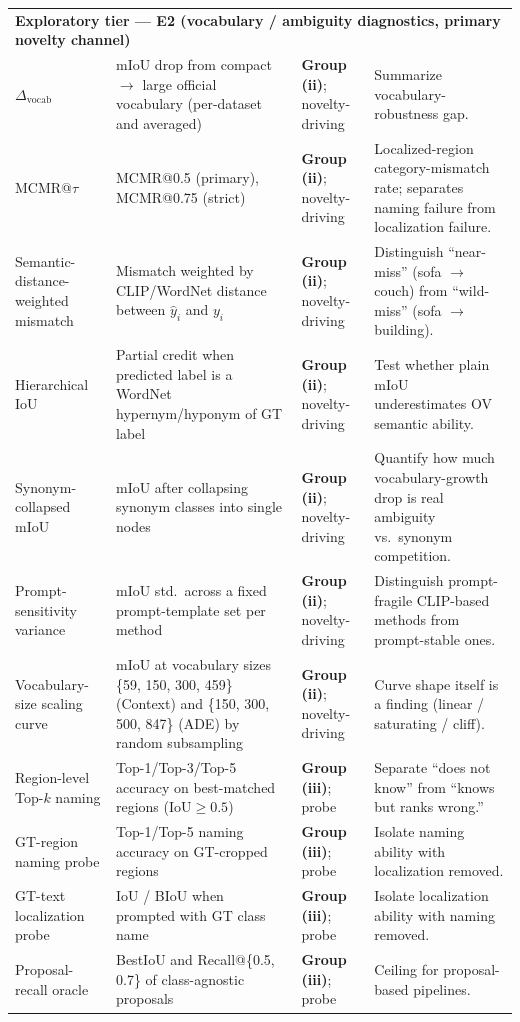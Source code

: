 \documentclass[11pt,a4paper]{article}
\begin{document}
{\begin{longtable}{p{} p{} p{} p{}}
\midrule
\multicolumn{4}{l}{\textbf{Exploratory tier --- E2 (vocabulary / ambiguity diagnostics, primary novelty channel)}} \\
$\Delta_{\mathrm{vocab}}$ & mIoU drop from compact $\to$ large official vocabulary (per-dataset and averaged) & \textbf{Group (ii)}; novelty-driving & Summarize vocabulary-robustness gap. \\
MCMR@$\tau$ & MCMR@0.5 (primary), MCMR@0.75 (strict) & \textbf{Group (ii)}; novelty-driving & Localized-region category-mismatch rate; separates naming failure from localization failure. \\
Semantic-distance-weighted mismatch & Mismatch weighted by CLIP/WordNet distance between $\hat{y}_i$ and $y_i$ & \textbf{Group (ii)}; novelty-driving & Distinguish ``near-miss'' (sofa $\to$ couch) from ``wild-miss'' (sofa $\to$ building). \\
Hierarchical IoU & Partial credit when predicted label is a WordNet hypernym/hyponym of GT label & \textbf{Group (ii)}; novelty-driving & Test whether plain mIoU underestimates OV semantic ability. \\
Synonym-collapsed mIoU & mIoU after collapsing synonym classes into single nodes & \textbf{Group (ii)}; novelty-driving & Quantify how much vocabulary-growth drop is real ambiguity vs.\ synonym competition. \\
Prompt-sensitivity variance & mIoU std.\ across a fixed prompt-template set per method & \textbf{Group (ii)}; novelty-driving & Distinguish prompt-fragile CLIP-based methods from prompt-stable ones. \\
Vocabulary-size scaling curve & mIoU at vocabulary sizes \{59, 150, 300, 459\} (Context) and \{150, 300, 500, 847\} (ADE) by random subsampling & \textbf{Group (ii)}; novelty-driving & Curve shape itself is a finding (linear / saturating / cliff). \\
Region-level Top-$k$ naming & Top-1/Top-3/Top-5 accuracy on best-matched regions ($\mathrm{IoU}\ge 0.5$) & \textbf{Group (iii)}; probe & Separate ``does not know'' from ``knows but ranks wrong.'' \\
GT-region naming probe & Top-1/Top-5 naming accuracy on GT-cropped regions & \textbf{Group (iii)}; probe & Isolate naming ability with localization removed. \\
GT-text localization probe & IoU / BIoU when prompted with GT class name & \textbf{Group (iii)}; probe & Isolate localization ability with naming removed. \\
Proposal-recall oracle & BestIoU and Recall@\{0.5, 0.7\} of class-agnostic proposals & \textbf{Group (iii)}; probe & Ceiling for proposal-based pipelines. \\

\end{longtable}}
\end{document}
